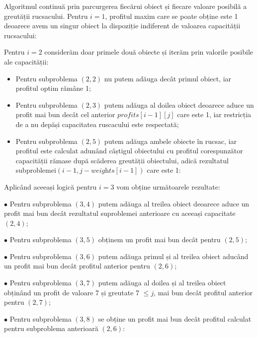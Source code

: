 \begin{sloppypar}
Algoritmul continuă prin parcurgerea fiecărui obiect și fiecare valoare posibilă a greutății rucsacului. Pentru $i = 1$, profitul maxim care se poate obține este 1 deoarece avem un singur obiect la dispoziție indiferent de valoarea capacității rucsacului: 


Pentru $i = 2$ considerăm doar primele două obiecte și iterăm prin valorile posibile ale capacității: \par
\begin{itemize}
\item Pentru subproblema $(2,2)$ nu putem adăuga decât primul obiect, iar profitul optim rămâne 1; 
\item Pentru subproblema $(2, 3)$ putem adăuga al doilea obiect deoarece aduce un profit mai bun decât cel anterior $\textit{profits}[i - 1][j]$ care este 1, iar restricția de a nu depăși capacitatea ruscacului este respectată; 
\item Pentru subproblema $(2, 5)$ putem adăuga ambele obiecte în rucsac, iar profitul este calculat adunând câștigul obiectului cu profitul corespunzător capacității rămase după scăderea greutății obiectului, adică rezultatul subproblemei$(i - 1, j - \textit{weights}[i - 1])$ care este 1: 
\end{itemize}


Aplicând aceeași logică pentru $i = 3$ vom obține următoarele rezultate: \par
$\bullet$ Pentru subproblema $(3, 4)$ putem adăuga al treilea obiect deoarece aduce un profit mai bun decât rezultatul suproblemei anterioare cu aceeași capacitate $(2, 4)$; \par
$\bullet$ Pentru subproblema $(3, 5)$ obținem un profit mai bun decât pentru $(2, 5)$; \par
$\bullet$ Pentru subproblema $(3, 6)$ putem adăuga primul și al treilea obiect aducând un profit mai bun decât profitul anterior pentru $(2, 6)$; \par
$\bullet$ Pentru subproblema $(3, 7)$ putem adăuga al doilea și al treilea obiect obținând un profit de valoare 7 și greutate 7 $ \le j$, mai bun decât profitul anterior pentru $(2, 7)$; \par
$\bullet$ Pentru subproblema $(3, 8)$ se obține un profit mai bun decât profitul calculat pentru subproblema anterioară $(2, 6)$: \par


\end{sloppypar}
